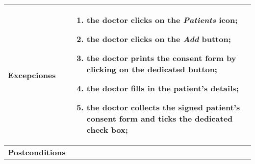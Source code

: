 \begin{longtable}{| p{4cm} | p{10cm} |}
\hline

\textbf{Excepciones} &\mbox{}\par\vspace{-\baselineskip}
\begin{enumerate}[leftmargin=0.7cm, topsep=0.1cm]
\item the doctor clicks on the \textit{Patients} icon;
\item the doctor clicks on the \textit{Add} button;
\item the doctor prints the consent form by clicking on the dedicated button;
\item the doctor fills in the patient's details;
\item the doctor collects the signed patient's consent form and ticks the dedicated check box;
\end{enumerate}\\

\hline

\textbf{Postconditions} & \\

\hline


\end{longtable}


